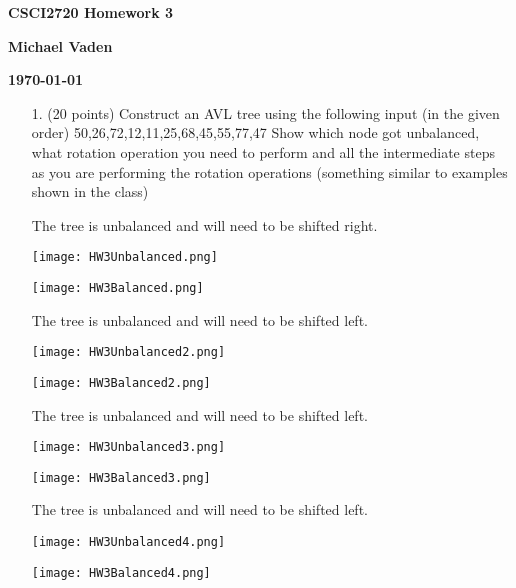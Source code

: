 \documentclass{article}
\begin{document}
    \begin{center}
        \Large
        \textbf{CSCI2720 Homework 3}
            
        \vspace{0.4cm}
        \large
            
        \vspace{0.4cm}
        \textbf{Michael Vaden}
        
        \vspace{0.9cm}
        \textbf{\today}
    \end{center}
    \begin{enumerate}
        \item[1.] (20 points) Construct an AVL tree using the following input (in the
        given order) 50,26,72,12,11,25,68,45,55,77,47
        Show which node got unbalanced, what rotation operation you need
        to perform and all the intermediate steps as you are performing the
        rotation operations (something similar to examples shown in the class)
        
        The tree is unbalanced and will need to be shifted right.
        \begin{center}
            \texttt{[image: HW3Unbalanced.png]}
        \end{center}
        \begin{center}
            \texttt{[image: HW3Balanced.png]}
        \end{center}

        The tree is unbalanced and will need to be shifted left.
        \begin{center}
            \texttt{[image: HW3Unbalanced2.png]}
        \end{center}
        \begin{center}
            \texttt{[image: HW3Balanced2.png]}
        \end{center}

        The tree is unbalanced and will need to be shifted left.
        \begin{center}
            \texttt{[image: HW3Unbalanced3.png]}
        \end{center}
        \begin{center}
            \texttt{[image: HW3Balanced3.png]}
        \end{center}

        The tree is unbalanced and will need to be shifted left.
        \begin{center}
            \texttt{[image: HW3Unbalanced4.png]}
        \end{center}
        \begin{center}
            \texttt{[image: HW3Balanced4.png]}
        \end{center}


\end{enumerate}
\end{document}
